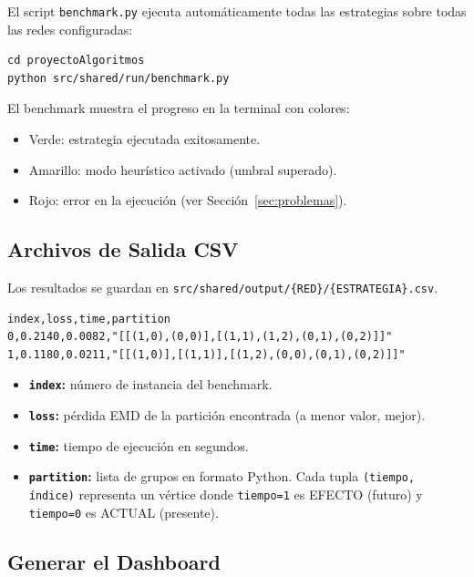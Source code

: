 El script \lstinline|benchmark.py| ejecuta automáticamente todas las estrategias sobre todas las redes configuradas:

\begin{lstlisting}[style=shell, caption={Ejecutar el benchmark completo.}]
cd proyectoAlgoritmos
python src/shared/run/benchmark.py
\end{lstlisting}

El benchmark muestra el progreso en la terminal con colores:
\begin{itemize}[itemsep=2pt]
    \item Verde: estrategia ejecutada exitosamente.
    \item Amarillo: modo heurístico activado (umbral superado).
    \item Rojo: error en la ejecución (ver Sección~\ref{sec:problemas}).
\end{itemize}

\subsection{Archivos de Salida CSV}

Los resultados se guardan en \lstinline|src/shared/output/{RED}/{ESTRATEGIA}.csv|.

\begin{lstlisting}[caption={Ejemplo de archivo de salida generado.}]
index,loss,time,partition
0,0.2140,0.0082,"[[(1,0),(0,0)],[(1,1),(1,2),(0,1),(0,2)]]"
1,0.1180,0.0211,"[[(1,0)],[(1,1)],[(1,2),(0,0),(0,1),(0,2)]]"
\end{lstlisting}

\begin{itemize}[itemsep=4pt]
    \item \textbf{\texttt{index}:} número de instancia del benchmark.
    \item \textbf{\texttt{loss}:} pérdida EMD de la partición encontrada (a menor valor, mejor).
    \item \textbf{\texttt{time}:} tiempo de ejecución en segundos.
    \item \textbf{\texttt{partition}:} lista de grupos en formato Python. Cada tupla \texttt{(tiempo, índice)} representa un vértice donde \texttt{tiempo=1} es EFECTO (futuro) y \texttt{tiempo=0} es ACTUAL (presente).
\end{itemize}

\subsection{Generar el Dashboard}

